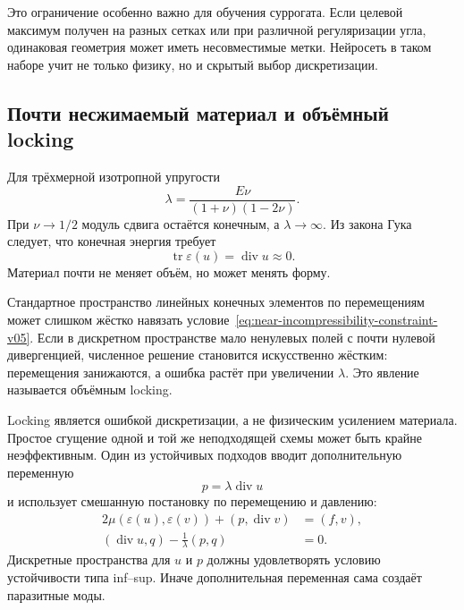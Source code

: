 Это ограничение особенно важно для обучения суррогата. Если целевой максимум получен на разных сетках или при различной регуляризации угла, одинаковая геометрия может иметь несовместимые метки. Нейросеть в таком наборе учит не только физику, но и скрытый выбор дискретизации.

\subsection{Почти несжимаемый материал и объёмный locking}

Для трёхмерной изотропной упругости
\begin{equation}
\label{eq:lame-near-incompressible-v05}
 \lambda
 =\frac{E\nu}{(1+\nu)(1-2\nu)}.
\end{equation}
При $\nu\to 1/2$ модуль сдвига остаётся конечным, а $\lambda\to\infty$. Из закона Гука следует, что конечная энергия требует
\begin{equation}
\label{eq:near-incompressibility-constraint-v05}
 \operatorname{tr}\varepsilon(u)
 =\operatorname{div}u
 \approx 0.
\end{equation}
Материал почти не меняет объём, но может менять форму.

Стандартное пространство линейных конечных элементов по перемещениям может слишком жёстко навязать условие~\eqref{eq:near-incompressibility-constraint-v05}. Если в дискретном пространстве мало ненулевых полей с почти нулевой дивергенцией, численное решение становится искусственно жёстким: перемещения занижаются, а ошибка растёт при увеличении $\lambda$. Это явление называется объёмным locking.

Locking является ошибкой дискретизации, а не физическим усилением материала. Простое сгущение одной и той же неподходящей схемы может быть крайне неэффективным. Один из устойчивых подходов вводит дополнительную переменную
\begin{equation}
\label{eq:elastic-pressure-v05}
 p=\lambda\operatorname{div}u
\end{equation}
и использует смешанную постановку по перемещению и давлению:
\begin{align}
 2\mu(\varepsilon(u),\varepsilon(v))
 +(p,\operatorname{div}v)
 &=(f,v),
 \label{eq:mixed-elasticity-momentum-v05}\\
 (\operatorname{div}u,q)
 -\frac1\lambda(p,q)
 &=0.
 \label{eq:mixed-elasticity-constraint-v05}
\end{align}
Дискретные пространства для $u$ и $p$ должны удовлетворять условию устойчивости типа inf--sup. Иначе дополнительная переменная сама создаёт паразитные моды.

